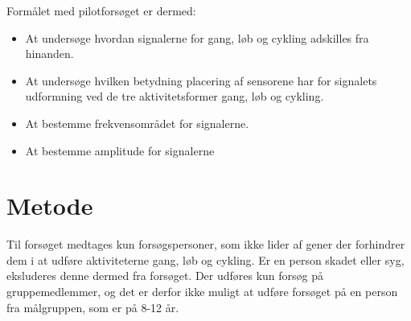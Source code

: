 Formålet med pilotforsøget er dermed:\vspace{-3mm}
\begin{itemize}
\item At undersøge hvordan signalerne for gang, løb og cykling adskilles fra hinanden. 
\item At undersøge hvilken betydning placering af sensorene har for signalets udformning ved de tre aktivitetsformer gang, løb og cykling. 
\item At bestemme frekvensområdet for signalerne.
\item At bestemme amplitude for signalerne 
\end{itemize}

\section{Metode}

Til forsøget medtages kun forsøgspersoner, som ikke lider af gener der forhindrer dem i at udføre aktiviteterne gang, løb og cykling. Er en person skadet eller syg, eksluderes denne dermed fra forsøget. Der udføres kun forsøg på gruppemedlemmer, og det er derfor ikke muligt at udføre forsøget på en person fra målgruppen, som er på 8-12 år. 

